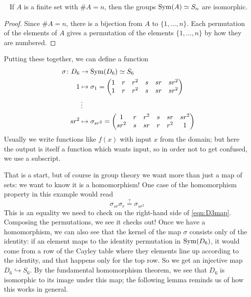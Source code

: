 \documentclass[11pt, reqno]{amsart}
\begin{document}
\begin{lem}~\label{lem:An}
If $A$ is a finite set with $\#A=n$, then the groups $\operatorname{Sym}(A) \simeq S_n$ are isomorphic.
\end{lem}

\begin{proof}
Since $\#A=n$, there is a bijection from $A$ to $\{1,\dots,n\}$.  Each permutation of the elements of $A$ gives a permutation of the elements $\{1,\dots,n\}$ by how they are numbered.  
\end{proof}

Putting these together, we can define a function
\begin{equation}~\label{eqn:D3map}
\begin{aligned}
\sigma \colon D_6 &\to \operatorname{Sym}(D_6) \simeq S_6 \\
1 &\mapsto \sigma_1 = \begin{pmatrix}
1 & r & r^2 & s & sr & sr^2 \\
1 & r & r^2 & s & sr & sr^2
\end{pmatrix} \\
&\vdots \\
sr^2 &\mapsto \sigma_{sr^2} = \begin{pmatrix}
1 & r & r^2 & s & sr & sr^2 \\
sr^2 & s & sr & r & r^2 & 1
\end{pmatrix} 
\end{aligned}
\end{equation}
Usually we write functions like $f(x)$ with input $x$ from the domain; but here the output is itself a function which wants input, so in order not to get confused, we use a subscript.  

That is a start, but of course in group theory we want more than just a map of sets: we want to know it is a homomorphism!  One case of the homomorphism property in this example would read
\begin{equation} 
\sigma_{sr}\sigma_{r} \overset{?}{=} \sigma_{sr^2} 
\end{equation}
This is an equality we need to check on the right-hand side of \eqref{eqn:D3map}.  Composing the permutations, we see it checks out!  Once we have a homomorphism, we can also see that the kernel of the map $\sigma$ consists only of the identity: if an element maps to the identity permutation in $\operatorname{Sym}(D_6)$, it would come from a row of the Cayley table where they elements line up according to the identity, and that happens only for the top row.  So we get an injective map $D_6 \hookrightarrow S_6$.  By the fundamental homomorphism theorem, we see that $D_6$ is isomorphic to its image under this map; the following lemma reminds us of how this works in general.
\end{document}
